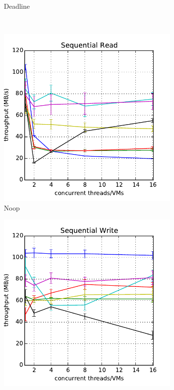 \documentclass{acmsig}
\begin{document}
\begin{figure}[t]
\begin{subfigure}[b]{0.3\textwidth}
     \caption{Deadline}
     \label{fig:aggthroughput_dealine_read}
   \end{subfigure}
    ~ %
   \begin{subfigure}[b]{0.3\textwidth}
     \includegraphics[width=\textwidth]{figures/throughput_noop_read.pdf}
     \caption{Noop}
     \label{fig:aggthroughput_noop_read}
   \end{subfigure}
   \hfill
   \begin{subfigure}[b]{0.3\textwidth}
     \includegraphics[width=\textwidth]{figures/throughput_cfq_write.pdf}

\end{subfigure}
\end{figure}
\end{document}
